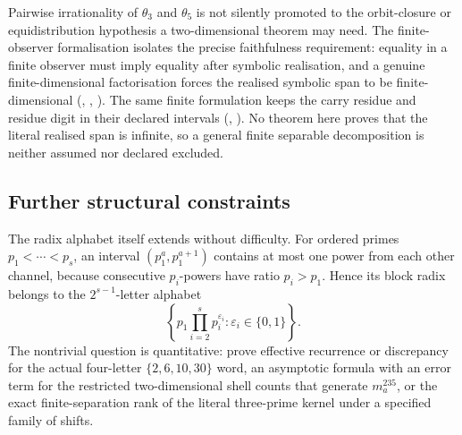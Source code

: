 \documentclass[11pt]{article}
\begin{document}
Pairwise irrationality of $\theta_3$ and $\theta_5$ is not silently promoted
to the orbit-closure or equidistribution hypothesis a two-dimensional theorem
may need.  The finite-observer formalisation isolates the precise
faithfulness requirement: equality in a finite observer must imply equality
after symbolic realisation, and a genuine finite-dimensional factorisation
forces the realised symbolic span to be finite-dimensional
(,
,
).
The same finite formulation keeps the carry residue and residue digit in their
declared intervals
(,
).
No theorem here proves that the literal realised span is infinite, so a
general finite separable decomposition is neither assumed nor declared
excluded.

\subsection{Further structural constraints}

The radix alphabet itself extends without difficulty.  For ordered primes
$p_1<\cdots<p_s$, an interval $(p_1^a,p_1^{a+1})$ contains at most one power
from each other channel, because consecutive $p_i$-powers have ratio
$p_i>p_1$.  Hence its block radix belongs to the $2^{s-1}$-letter alphabet
\[
 \left\{p_1\prod_{i=2}^s p_i^{\varepsilon_i}:
   \varepsilon_i\in\{0,1\}\right\}.
\]
The nontrivial question is quantitative: prove effective recurrence or
discrepancy for the actual four-letter $\{2,6,10,30\}$ word, an asymptotic
formula with an error term for the restricted two-dimensional shell counts
that generate $m_a^{235}$, or the exact finite-separation rank of the literal
three-prime kernel under a specified family of shifts.
\end{document}
